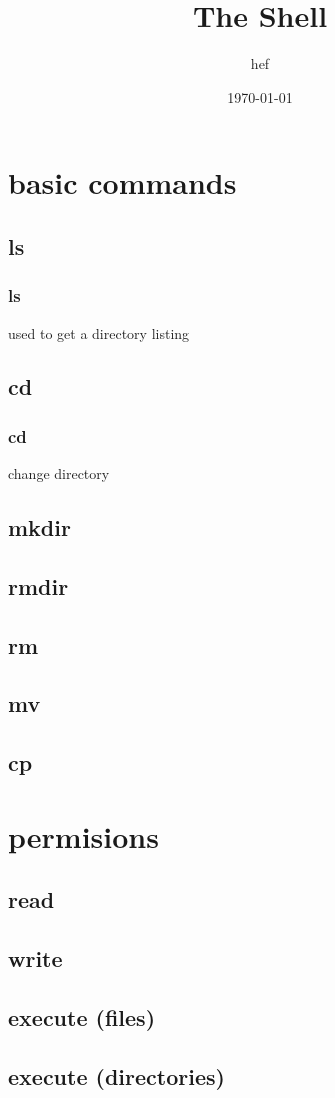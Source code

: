 \documentclass[hyperref={pdfpagelabels=false}]{beamer}
\title{The Shell}
\author{hef}
\date{\today}
\begin{document}
\frame{\titlepage}
\section[outline]{}
\frame{\tableofcontents}
\section{basic commands}
\subsection{ls}
\frame
{
	\frametitle{ls}
	used to get a directory listing
}
\subsection{cd}
\frame
{
	\frametitle{cd}
	change directory
}
\subsection{mkdir}
\subsection{rmdir}
\subsection{rm}
\subsection{mv}
\subsection{cp}
\section{permisions}
\subsection{read}
\subsection{write}
\subsection{execute (files)}
\subsection{execute (directories)}
\end{document}
